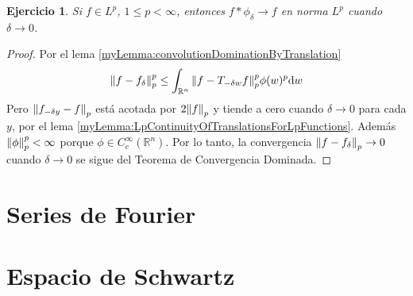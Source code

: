 \documentclass{article}
\newcommand{\realNumbers}{\mathbb{R}}
\newtheorem{exercise}{Ejercicio}
\theoremstyle{remark}
\begin{document}
  \begin{exercise}
    Si \(f \in L^p\), \(1 \leq p < \infty\), entonces \(f * \phi_{\delta} \rightarrow f\) en norma \(L^p\) cuando \(\delta \rightarrow 0\).
  \end{exercise}
  \begin{proof}
    Por el lema \ref{myLemma:convolutionDominationByTranslation}
    \begin{align}
      \norm{f - f_{\delta}}_p^p 
      \leq 
      \int_{\realNumbers^n} \norm{f - T_{- \delta w} f}_p^p \phi(w)^p \dd w
    \end{align}
    Pero \(\norm{f_{- \delta y} - f}_p\) está acotada por \(2 \norm{f}_p\) y tiende a cero cuando \(\delta \rightarrow 0\) para cada \(y\), por el lema \ref{myLemma:LpContinuityOfTranslationsForLpFunctions}.
    Además \(\norm{\phi}_p^p < \infty\) porque \(\phi \in C^{\infty}_c(\realNumbers^n)\).
    Por lo tanto, la convergencia \(\norm{f - f_{\delta}}_p \rightarrow 0\) cuando \(\delta \rightarrow 0\) se sigue del Teorema de Convergencia Dominada.
  \end{proof}

\section{Series de Fourier}

\section{Espacio de Schwartz}
\end{document}
